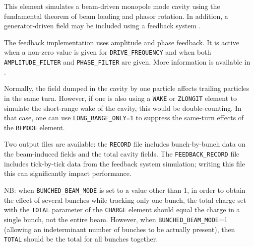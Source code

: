 This element simulates a beam-driven monopole mode cavity using the fundamental theorem of beam loading and phasor rotation.
In addition, a generator-driven field may be included using a feedback system \cite{Berenc-IPAC15-MOPMA006}.

The feedback implementation uses amplitude and phase feedback.
It is active when a non-zero value is given for \verb|DRIVE_FREQUENCY| and when
both \verb|AMPLITUDE_FILTER| and \verb|PHASE_FILTER| are given. 
More information is available in \cite{Berenc-IPAC15-MOPMA006}.

Normally, the field dumped in the cavity by one particle affects trailing particles in the same turn.
However, if one is also using a \verb|WAKE| or \verb|ZLONGIT| element to simulate the short-range wake of the cavity, this would be double-counting.
In that case, one can use \verb|LONG_RANGE_ONLY=1| to suppress the same-turn effects of the \verb|RFMODE| element.

Two output files are available: the \verb|RECORD| file includes bunch-by-bunch data on the beam-induced fields and the total cavity fields.
The \verb|FEEDBACK_RECORD| file includes tick-by-tick data from the feedback system simulation; writing this file this can significantly impact performance.


NB: when \verb|BUNCHED_BEAM_MODE| is set to a value other than 1, in order to obtain the effect of several bunches while tracking
only one bunch, the total charge set with the \verb|TOTAL| parameter of the \verb|CHARGE| element should equal the charge in
a single bunch, not the entire beam. However, when \verb|BUNCHED_BEAM_MODE|=1 (allowing an indeterminant number of bunches to be
actually present), then \verb|TOTAL| should be the total for all bunches together.
